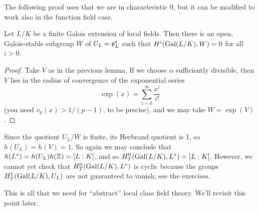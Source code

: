The following proof uses that we are in characteristic 0, but it can be modified to work also in the function field case.
\begin{lemma}
Let $L/K$ be a finite Galois extension of local fields. Then there
is an open, Galois-stable subgroup $W$
of $U_L = \mathfrak{o}_L^*$ such that $H^i(\operatorname{Gal}(L/K), W) = 0$ for all $i>0$.
\end{lemma}
\begin{proof}
Take $V$ as in the previous lemma. If we choose $\alpha$ sufficiently divisible,
then $V$ lies in the radius of convergence of the exponential series
\[
\exp(x) = \sum_{i=0}^\infty \frac{x^i}{i!}
\]
(you need $v_p(x) > 1/(p-1)$, to be precise), and we may take $W = \exp(V)$.
\end{proof}

Since the quotient $U_L/W$ is finite, its Herbrand quotient is 1, so
$h(U_L) = h(V) = 1$. So again we may conclude that
$h(L^*) = h(U_L) h(\mathbb{Z}) = [L:K]$, and so $H^0_T(\operatorname{Gal}(L/K), L^*) = [L:K]$.
However, we cannot yet check that $H^0_T(\operatorname{Gal}(L/K), L^*)$ is cyclic because the groups
$H^1_T(\operatorname{Gal}(L/K), U_L)$ are not guaranteed to vanish; see the exercises.

 This is all that we need for ``abstract''
local class field theory. We'll revisit this point later.


